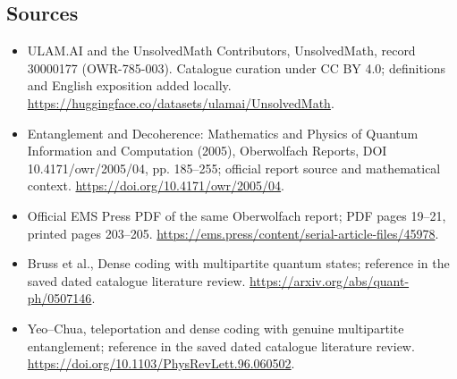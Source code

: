 \documentclass[11pt]{article}
\begin{document}
\subsection{Sources}
\begin{itemize}
\item[\hypertarget{source:30000177:1}{S1}] ULAM.AI and the UnsolvedMath Contributors, UnsolvedMath, record 30000177 (OWR-785-003). Catalogue curation under CC BY 4.0; definitions and English exposition added locally.
\url{https://huggingface.co/datasets/ulamai/UnsolvedMath}.
\item[\hypertarget{source:30000177:2}{S2}] Entanglement and Decoherence: Mathematics and Physics of Quantum Information and Computation (2005), Oberwolfach Reports, DOI 10.4171/owr/2005/04, pp. 185--255; official report source and mathematical context.
\url{https://doi.org/10.4171/owr/2005/04}.
\item[\hypertarget{source:30000177:3}{S3}] Official EMS Press PDF of the same Oberwolfach report; PDF pages 19--21, printed pages 203--205.
\url{https://ems.press/content/serial-article-files/45978}.
\item[\hypertarget{source:30000177:4}{S4}] Bruss et al., Dense coding with multipartite quantum states; reference in the saved dated catalogue literature review.
\url{https://arxiv.org/abs/quant-ph/0507146}.
\item[\hypertarget{source:30000177:5}{S5}] Yeo--Chua, teleportation and dense coding with genuine multipartite entanglement; reference in the saved dated catalogue literature review.
\url{https://doi.org/10.1103/PhysRevLett.96.060502}.
\end{itemize}
\label{end:30000177}
\end{document}

